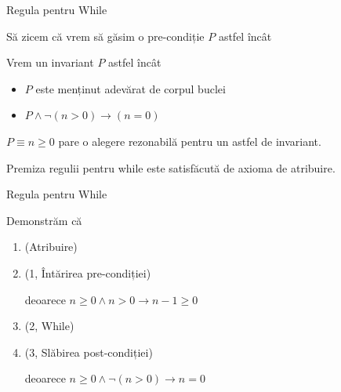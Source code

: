 \begin{frame}{Regula pentru While}

\begin{example}
Să zicem că vrem să găsim o pre-condiție $P$ astfel încât
\begin{center}
\end{center} 
\pause
Vrem un invariant $P$ astfel încât
\begin{itemize}
	\item $P$ este menținut adevărat de corpul buclei
	\item $P \wedge \neg(n>0) \to (n=0)$
\end{itemize}
\pause
\alert{$P \equiv n\geq 0$} pare o alegere rezonabilă pentru un astfel de invariant.

Premiza regulii pentru while este satisfăcută de axioma de atribuire.


\end{example}
\end{frame}

\begin{frame}{Regula pentru While}

\begin{example}[cont.]
	Demonstrăm că
\begin{center}
\end{center}

\begin{enumerate}[<+->]
	\item {} \hfill (Atribuire)
	\item {} \hfill (1, Întărirea pre-condiției)
	
		deoarece $n\geq 0 \wedge n > 0 \to n-1 \geq 0$
	\item {} \hfill (2, While)
	\item {} \hfill (3, Slăbirea post-condiției)

		deoarece $n \geq 0 \wedge \neg(n > 0) \to n = 0$
\end{enumerate}
%
\end{example}
\end{frame}

